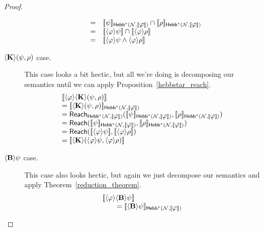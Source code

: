 \documentclass[letterpaper]{article}
\theoremstyle{definition}
\newcommand{\semantics}[1]{[\![\mbox{\em $ #1 $\/}]\!]}
\newcommand{\Net}{\mathcal{N}}
\newcommand{\Reach}{\textsf{Reach}}
\newcommand{\Hebbstar}[2]{\textsf{Hebb}^*(#1, #2)}
\newcommand{\diaBelieve}[1]{\langle \textrm{\textup{\textbf{B}}} \rangle #1}
\newcommand{\diaKnow}[2]{\langle \textrm{\textup{\textbf{K}}} \rangle(#1, #2)}
\newcommand{\diaHebbop}[1]{\langle #1\rangle}
\begin{document}
\begin{proof}
\begin{description}
\[\begin{array}{lcl}
            & = & \semantics{\psi}_{\Hebbstar{\Net}{\semantics{\varphi}}} \cap \semantics{\rho}_{\Hebbstar{\Net}{\semantics{\varphi}}}\\

            & = & \semantics{\diaHebbop{\varphi} \psi} \cap \semantics{\diaHebbop{\varphi} \rho}\\

            & = & \semantics{\diaHebbop{\varphi} \psi \land \diaHebbop{\varphi} \rho}
        \end{array}
        \]

        \item[$\diaKnow{\psi}{\rho}$ case.] This case looks a bit hectic, but all we're doing is decomposing our semantics until we can apply Proposition~\ref{hebbstar_reach}.
        \[
        \begin{array}{l}
            \semantics{\diaHebbop{\varphi} \diaKnow{\psi}{\rho}}\\
            
            = \semantics{\diaKnow{\psi}{\rho}}_{\Hebbstar{\Net}{\semantics{\varphi}}}\\
            
            = \Reach_{\Hebbstar{\Net}{\semantics{\varphi}}}(\semantics{\psi}_{\Hebbstar{\Net}{\semantics{\varphi}}}, \semantics{\rho}_{\Hebbstar{\Net}{\semantics{\varphi}}}) \\

            = \Reach(\semantics{\psi}_{\Hebbstar{\Net}{\semantics{\varphi}}}, \semantics{\rho}_{\Hebbstar{\Net}{\semantics{\varphi}}})\\

            = \Reach(\semantics{\diaHebbop{\varphi} \psi}, \semantics{\diaHebbop{\varphi} \rho})\\

            = \semantics{\diaKnow{\diaHebbop{\varphi} \psi}{\diaHebbop{\varphi} \rho}}
        \end{array}
        \]

        \item[$\diaBelieve{\psi}$ case.] This case also looks hectic, but again we just decompose our semantics and apply Theorem~\ref{reduction_theorem}.
        \[
        \begin{array}{l}
            \semantics{\diaHebbop{\varphi} \diaBelieve{\psi}}\\
            
            \quad \quad = \semantics{\diaBelieve{\psi}}_{\Hebbstar{\Net}{\semantics{\varphi}}}\\
            

\end{array}\]
\end{description}
\end{proof}
\end{document}

